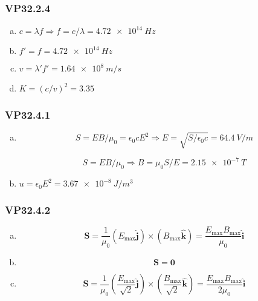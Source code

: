 \documentclass{article}
\begin{document}
\subsubsection{VP32.2.4}

\begin{enumerate}[(a)]
  \item $c = \lambda f \Rightarrow f = c / \lambda = \qty{4.72e14}{Hz}$

  \item $f' = f = \qty{4.72e14}{Hz}$

  \item $v = \lambda' f' = \qty{1.64e8}{m/s}$

  \item $K = (c / v)^2 = 3.35$
\end{enumerate}

\subsubsection{VP32.4.1}

\begin{enumerate}[(a)]
  \item

        \[S = E B / \mu_0 = \epsilon_0 c E^2 \Rightarrow E = \sqrt{S / \epsilon_0 c} = \qty{64.4}{V/m}\]

        \[S = E B / \mu_0 \Rightarrow B = \mu_0 S / E = \qty{2.15e-7}{T}\]

  \item $u = \epsilon_0 E^2 = \qty{3.67e-8}{J/m^3}$
\end{enumerate}

\subsubsection{VP32.4.2}

\begin{enumerate}[(a)]
  \item \[\mathbf{S} = \frac{1}{\mu_0} (E_\text{max} \hat{\mathbf{j}}) \times (B_\text{max} \hat{\mathbf{k}}) = \frac{E_\text{max} B_\text{max}}{\mu_0} \hat{\mathbf{i}}\]

  \item \[\mathbf{S} = \mathbf{0}\]

  \item \[\mathbf{S} = \frac{1}{\mu_0} \left( \frac{E_\text{max}}{\sqrt{2}} \hat{\mathbf{j}} \right) \times \left( \frac{B_\text{max}}{\sqrt{2}} \hat{\mathbf{k}} \right) = \frac{E_\text{max} B_\text{max}}{2 \mu_0} \hat{\mathbf{i}}\]
\end{enumerate}
\end{document}
